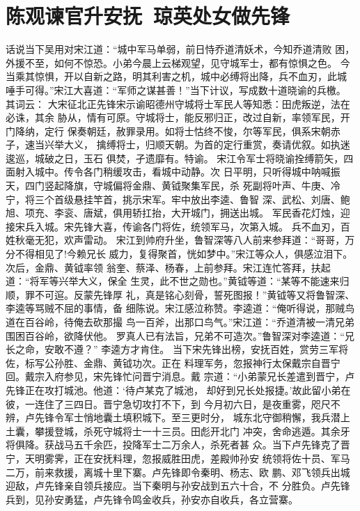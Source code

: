 \chapter{陈观谏官升安抚~琼英处女做先锋}

话说当下吴用对宋江道：“城中军马单弱，前日恃乔道清妖术，今知乔道清败
困，外援不至，如何不惊恐。小弟今晨上云梯观望，见守城军士，都有惊惧之色。
今当乘其惊惧，开以自新之路，明其利害之机，城中必缚将出降，兵不血刃，此城
唾手可得。”宋江大喜道：“军师之谋甚善！”当下计议，写成数十道晓谕的兵檄。
其词云：
大宋征北正先锋宋示谕昭德州守城将士军民人等知悉：田虎叛逆，法在必诛，其余
胁从，情有可原。守城将士，能反邪归正，改过自新，率领军民，开门降纳，定行
保奏朝廷，赦罪录用。如将士怙终不悛，尔等军民，俱系宋朝赤子，速当兴举大义，
擒缚将士，归顺天朝。为首的定行重赏，奏请优叙。如执迷逡巡，城破之日，玉石
俱焚，孑遗靡有。特谕。
宋江令军士将晓谕拴缚箭矢，四面射入城中。传令各门稍缓攻击，看城中动静。次
日平明，只听得城中呐喊振天，四门竖起降旗，守城偏将金鼎、黄钺聚集军民，杀
死副将叶声、牛庚、冷宁，将三个首级悬挂竿首，挑示宋军。牢中放出李逵、鲁智
深、武松、刘唐、鲍旭、项充、李衮、唐斌，俱用轿扛抬，大开城门，拥送出城。
军民香花灯烛，迎接宋兵入城。宋先锋大喜，传谕各门将佐，统领军马，次第入城。
兵不血刃，百姓秋毫无犯，欢声雷动。
宋江到帅府升坐，鲁智深等八人前来参拜道：“哥哥，万分不得相见了!今赖兄长
威力，复得聚首，恍如梦中。”宋江等众人，俱感泣泪下。次后，金鼎、黄钺率领
翁奎、蔡泽、杨春，上前参拜。宋江连忙答拜，扶起道：“将军等兴举大义，保全
生灵，此不世之勋也。”黄钺等道：“某等不能速来归顺，罪不可逭。反蒙先锋厚
礼，真是铭心刻骨，誓死图报！”黄钺等又将鲁智深、李逵等骂贼不屈的事情，备
细陈说。宋江感泣称赞。李逵道：“俺听得说，那贼鸟道在百谷岭，待俺去砍那撮
鸟一百斧，出那口鸟气。”宋江道：“乔道清被一清兄弟围困百谷岭，欲降伏他。
罗真人已有法旨，兄弟不可造次。”鲁智深对李逵道：“兄长之命，安敢不遵？”
李逵方才肯住。
当下宋先锋出榜，安抚百姓，赏劳三军将佐，标写公孙胜、金鼎、黄钺功次。正在
料理军务，忽报神行太保戴宗自晋宁回。戴宗入府参见，宋先锋忙问晋宁消息。戴
宗道：“小弟蒙兄长差遣到晋宁，卢先锋正在攻打城池。他道：‘待卢某克了城池，
却好到兄长处报捷。’故此留小弟在彼，一连住了三四日。晋宁急切攻打不下，到
今月初六日，是夜重雾，咫尺不辨，卢先锋令军士悄地囊土填积城下。至三更时分，
城东北守御稍懈，我兵潜上土囊，攀援登城，杀死守城将士一十三员。田彪开北门
冲突，舍命逃遁。其余牙将俱降。获战马五千余匹，投降军士二万余人，杀死者甚
众。当下卢先锋克了晋宁，天明雾霁，正在安抚料理，忽报威胜田虎，差殿帅孙安
统领将佐十员、军马二万，前来救援，离城十里下寨。卢先锋即令秦明、杨志、欧
鹏、邓飞领兵出城迎敌，卢先锋亲自领兵接应。当下秦明与孙安战到五六十合，不
分胜负。卢先锋兵到，见孙安勇猛，卢先锋令鸣金收兵，孙安亦自收兵，各立营寨。
